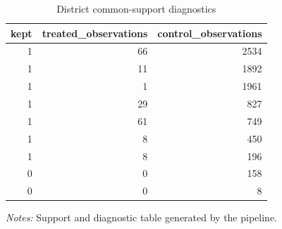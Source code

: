 \begin{table}[!htbp] \centering
\caption{District common-support diagnostics}
\begin{tabular}{rrr}
\toprule
kept & treated\_observations & control\_observations \\
\midrule
1 & 66 & 2534 \\
1 & 11 & 1892 \\
1 & 1 & 1961 \\
1 & 29 & 827 \\
1 & 61 & 749 \\
1 & 8 & 450 \\
1 & 8 & 196 \\
0 & 0 & 158 \\
0 & 0 & 8 \\
\bottomrule
\end{tabular}

\begin{minipage}{0.98\textwidth}
\footnotesize \textit{Notes:} Support and diagnostic table generated by the pipeline.
\end{minipage}
\end{table}
